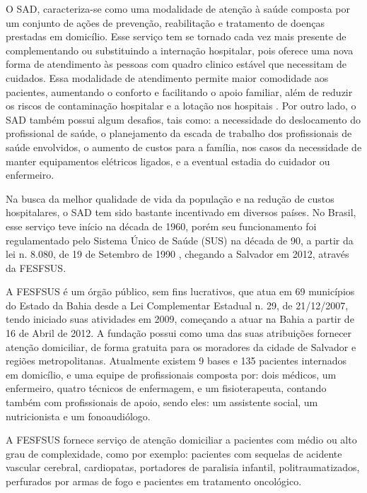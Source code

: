 
O \ac{SAD}, caracteriza-se como uma modalidade de atenção à saúde composta por um conjunto de ações de prevenção, reabilitação e tratamento de doenças prestadas em domicílio.
Esse serviço tem se tornado cada vez mais presente de complementando ou substituindo a internação hospitalar, pois oferece uma nova forma de atendimento às pessoas com quadro clinico estável que necessitam de cuidados.
Essa modalidade de atendimento permite maior comodidade aos pacientes, aumentando o conforto e facilitando o apoio familiar, além de reduzir os riscos de contaminação hospitalar e a lotação nos hospitais \cite{Kergosien:2009}.
Por outro lado, o \ac{SAD} também possui algum desafios, tais como: a necessidade do deslocamento do profissional de saúde, o planejamento da escada de trabalho dos profissionais de saúde envolvidos, o aumento de custos para a família, nos casos da necessidade de manter equipamentos elétricos ligados, e a eventual estadia do cuidador ou enfermeiro.%

Na busca da melhor qualidade de vida da população e na redução de custos hospitalares, o \ac{SAD} tem sido bastante incentivado em diversos países. 
No Brasil, esse serviço teve início na década de 1960, porém seu funcionamento foi regulamentado pelo Sistema Único de Saúde (SUS) na década de 90, a partir da lei n. 8.080, de 19 de Setembro de 1990 \cite{Silva:2010}, chegando a Salvador em 2012, através da \ac{FESFSUS}. 

A \ac{FESFSUS} é um órgão público, sem fins lucrativos, que atua em 69 municípios do Estado da Bahia desde a Lei Complementar Estadual n. 29, de 21/12/2007, tendo iniciado suas atividades em 2009, começando a atuar na Bahia a partir de 16 de Abril de 2012. A fundação possui como uma das suas atribuições fornecer atenção domiciliar, de forma gratuita para os moradores da cidade de Salvador e regiões metropolitanas. Atualmente existem 9 bases e 135 pacientes internados em domicílio, e uma equipe de profissionais composta por: dois médicos, um enfermeiro, quatro técnicos de enfermagem, e um fisioterapeuta, contando também com profissionais de apoio, sendo eles: um assistente social, um nutricionista e um fonoaudiólogo.

A \ac{FESFSUS} fornece serviço de atenção domiciliar a pacientes com médio ou alto grau de complexidade, como por exemplo: pacientes com sequelas de acidente vascular cerebral, cardiopatas, portadores de paralisia infantil, politraumatizados, perfurados por armas de fogo e pacientes em tratamento oncológico.

